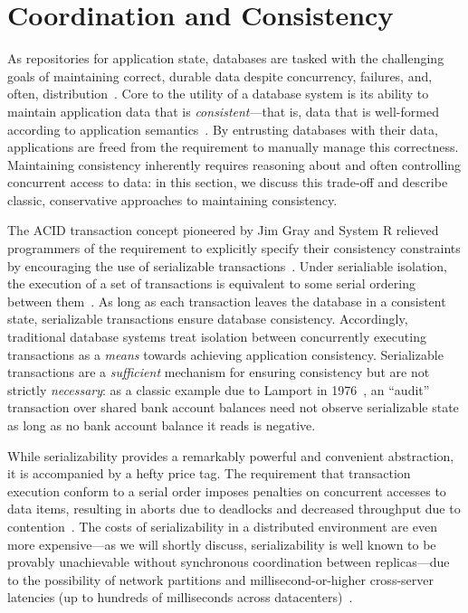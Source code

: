 
\section{Coordination and Consistency}
\label{sec:motivation}


As repositories for application state, databases are tasked with the
challenging goals of maintaining correct, durable data despite
concurrency, failures, and, often,
distribution~\cite{bernstein-book}. Core to the utility of a database
system is its ability to maintain application data that is
\textit{consistent}---that is, data that is well-formed according to
application semantics~\cite{gray-virtues}. By entrusting databases
with their data, applications are freed from the requirement to
manually manage this correctness. Maintaining consistency inherently
requires reasoning about and often controlling concurrent access to
data: in this section, we discuss this trade-off and describe classic,
conservative approaches to maintaining consistency.


 The ACID transaction concept
pioneered by Jim Gray and System R relieved programmers of the
requirement to explicitly specify their consistency constraints by
encouraging the use of serializable
transactions~\cite{gray-virtues}. Under serialiable isolation, the
execution of a set of transactions is equivalent to some serial
ordering between them~\cite{bernstein-book}. As long as each
transaction leaves the database in a consistent state, serializable
transactions ensure database consistency. Accordingly, traditional
database systems treat isolation between concurrently executing
transactions as a \textit{means} towards achieving application
consistency. Serializable transactions are a \textit{sufficient}
mechanism for ensuring consistency but are not strictly
\textit{necessary}: as a classic example due to Lamport in
1976~\cite{lamport-audit}, an ``audit'' transaction over shared bank
account balances need not observe serializable state as long as no
bank account balance it reads is negative.


While serializability provides a remarkably powerful and convenient
abstraction, it is accompanied by a hefty price tag. The requirement
that transaction execution conform to a serial order imposes penalties
on concurrent accesses to data items, resulting in aborts due to
deadlocks and decreased throughput due to
contention~\cite{bernstein-book,gray-book,gray-virtues}. The costs of
serializability in a distributed environment are even more
expensive---as we will shortly discuss, serializability is well known
to be provably unachievable without synchronous coordination between
replicas---due to the possibility of network partitions and
millisecond-or-higher cross-server latencies (up to hundreds of
milliseconds across datacenters)~\cite{hat-vldb,bobtail}.

